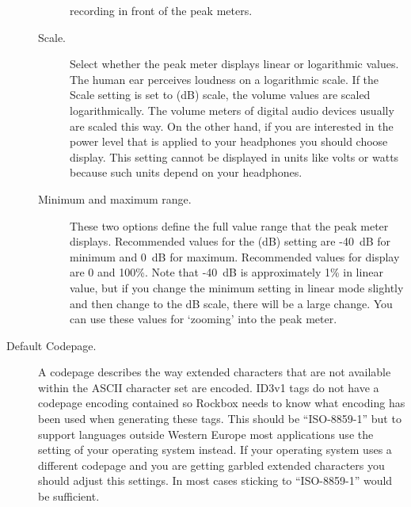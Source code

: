 \begin{description}
\begin{description}
{        recording in front of the peak meters.
    }
    \item[\label{ref:Peakmetersetting}Scale.]
      Select whether the peak meter displays linear or logarithmic values.
      The human ear perceives loudness on a logarithmic scale. If the Scale
      setting is set to  (dB) scale, the volume values
      are scaled logarithmically. The volume meters of digital audio
      devices usually are scaled this way. On the other hand, if you
      are interested in the power level that is applied to your headphones
      you should choose  display. This setting cannot be
      displayed in units like volts or watts because such units depend
      on your headphones.
    \item[Minimum and maximum range.]
      These two options define the full value range that the peak meter
      displays. Recommended values for the  (dB) setting
      are {}-40~dB for minimum and 0~dB for maximum. Recommended values
      for  display are 0 and 100\%. Note that {}-40~dB is
      approximately 1\% in linear value, but if you change the minimum
      setting in linear mode slightly and then change to the dB scale,
      there will be a large change. You can use these values for `zooming'
      into the peak meter.
    \end{description}

    \item[\label{ref:Defaultcodepage}Default Codepage.]
      A codepage describes the way extended characters that are not available
      within the ASCII character set are encoded. ID3v1 tags do not have a
      codepage encoding contained so Rockbox needs to know what encoding has
      been used when generating these tags. This should be ``ISO-8859-1'' but
      to support languages outside Western Europe most applications use
      the setting of your operating system instead. If your operating system
      uses a different codepage and you are getting garbled extended characters
      you should adjust this settings. In most cases sticking to
      ``ISO-8859-1'' would be sufficient.
  \end{description}
